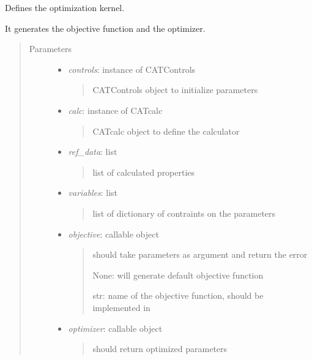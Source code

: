 \documentclass[letterpaper,10pt,english]{sphinxmanual}
\begin{document}
\begin{fulllineitems}
\label{classes:catkernel.CATKernel}
Defines the optimization kernel.

It generates the objective function and the optimizer.
\begin{quote}\begin{description}
\item[{Parameters}] \leavevmode\begin{itemize}
\item {} 
\emph{controls}: instance of CATControls
\begin{quote}

CATControls object to initialize parameters
\end{quote}

\item {} 
\emph{calc}: instance of CATcalc
\begin{quote}

CATcalc object to define the calculator
\end{quote}

\item {} 
\emph{ref\_data}: list
\begin{quote}

list of calculated properties
\end{quote}

\item {} 
\emph{variables}: list
\begin{quote}

list of dictionary of contraints on the parameters
\end{quote}

\item {} 
\emph{objective}: callable object
\begin{quote}

should take parameters as argument and return the error

None: will generate default objective function

str: name of the objective function, should be implemented in 
{\hyperref[classes:catkernel.CATobjective]{}}
\end{quote}

\item {} 
\emph{optimizer}: callable object
\begin{quote}

should return optimized parameters


\end{quote}
\end{itemize}
\end{description}
\end{quote}
\end{fulllineitems}
\end{document}
